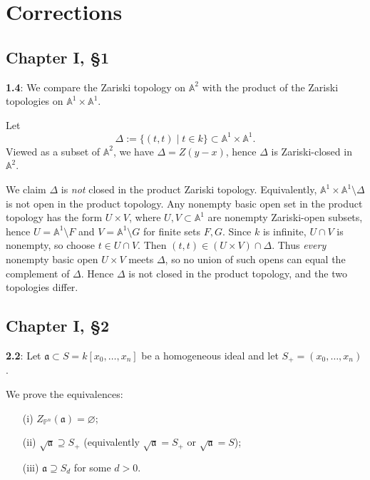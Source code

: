 \documentclass[12pt]{article}
\numberwithin{thm}{subsection}
\numberwithin{defn}{subsection}
\numberwithin{lemma}{subsection}
\numberwithin{example}{subsection}
\numberwithin{notation}{subsection}
\numberwithin{cor}{subsection}
\numberwithin{remark}{subsection}
\numberwithin{condition}{subsection}
\numberwithin{question}{subsection}
\numberwithin{construction}{subsection}
\numberwithin{construction}{subsection}
\numberwithin{construction}{subsection}
\begin{document}
\section{Corrections}

\subsection{Chapter I, \S 1}

\textbf{1.4}: 
We compare the Zariski topology on $\mathbb A^2$ with the product of the Zariski topologies on
$\mathbb A^1\times \mathbb A^1$.

Let
\[
\Delta:=\{(t,t)\mid t\in k\}\subset \mathbb A^1\times \mathbb A^1.
\]
Viewed as a subset of $\mathbb A^2$, we have $\Delta=Z(y-x)$, hence $\Delta$ is Zariski-closed in $\mathbb A^2$.

We claim $\Delta$ is \emph{not} closed in the product Zariski topology.
Equivalently, $\mathbb A^1\times \mathbb A^1\setminus \Delta$ is not open in the product topology.
Any nonempty basic open set in the product topology has the form $U\times V$, where $U,V\subset \mathbb A^1$ are nonempty
Zariski-open subsets, hence $U=\mathbb A^1\setminus F$ and $V=\mathbb A^1\setminus G$ for finite sets $F,G$.
Since $k$ is infinite, $U\cap V$ is nonempty, so choose $t\in U\cap V$. Then $(t,t)\in (U\times V)\cap \Delta$.
Thus \emph{every} nonempty basic open $U\times V$ meets $\Delta$, so no union of such opens can equal the complement of $\Delta$.
Hence $\Delta$ is not closed in the product topology, and the two topologies differ.


\subsection{Chapter I, \S 2}

\textbf{2.2}:
Let $\mathfrak a\subset S=k[x_0,\dots,x_n]$ be a homogeneous ideal and let $S_+=(x_0,\dots,x_n)$.

We prove the equivalences:
\begin{enumerate}
\item[(i)] $Z_{\mathbb P^n}(\mathfrak a)=\varnothing$;
\item[(ii)] $\sqrt{\mathfrak a}\supseteq S_+$ (equivalently $\sqrt{\mathfrak a}=S_+$ or $\sqrt{\mathfrak a}=S$);
\item[(iii)] $\mathfrak a\supseteq S_d$ for some $d>0$.
\end{enumerate}
\end{document}

